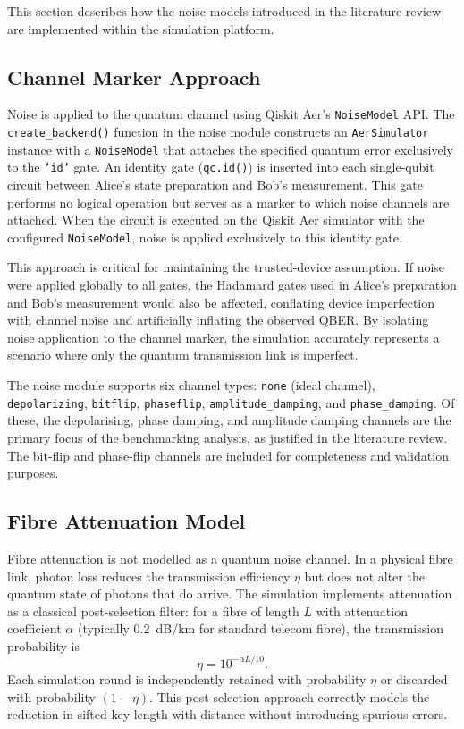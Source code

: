 \documentclass[10pt, a4paper]{report}
\begin{document}
This section describes how the noise models introduced in the literature review are implemented within the simulation platform.

\subsection{Channel Marker Approach}

Noise is applied to the quantum channel using Qiskit Aer's \texttt{NoiseModel} API. The \texttt{create\_backend()} function in the noise module constructs an \texttt{AerSimulator} instance with a \texttt{NoiseModel} that attaches the specified quantum error exclusively to the \texttt{'id'} gate. An identity gate (\texttt{qc.id()}) is inserted into each single-qubit circuit between Alice's state preparation and Bob's measurement. This gate performs no logical operation but serves as a marker to which noise channels are attached. When the circuit is executed on the Qiskit Aer simulator with the configured \texttt{NoiseModel}, noise is applied exclusively to this identity gate.

This approach is critical for maintaining the trusted-device assumption. If noise were applied globally to all gates, the Hadamard gates used in Alice's preparation and Bob's measurement would also be affected, conflating device imperfection with channel noise and artificially inflating the observed QBER. By isolating noise application to the channel marker, the simulation accurately represents a scenario where only the quantum transmission link is imperfect.

The noise module supports six channel types: \texttt{none} (ideal channel), \texttt{depolarizing}, \texttt{bitflip}, \texttt{phaseflip}, \texttt{amplitude\_damping}, and \texttt{phase\_damping}. Of these, the depolarising, phase damping, and amplitude damping channels are the primary focus of the benchmarking analysis, as justified in the literature review. The bit-flip and phase-flip channels are included for completeness and validation purposes.

\subsection{Fibre Attenuation Model}

Fibre attenuation is not modelled as a quantum noise channel. In a physical fibre link, photon loss reduces the transmission efficiency $\eta$ but does not alter the quantum state of photons that do arrive. The simulation implements attenuation as a classical post-selection filter: for a fibre of length $L$ with attenuation coefficient $\alpha$ (typically 0.2~dB/km for standard telecom fibre), the transmission probability is
%
\begin{equation}
\label{eq:attenuation}
\eta = 10^{-\alpha L / 10}.
\end{equation}
%
Each simulation round is independently retained with probability $\eta$ or discarded with probability $(1 - \eta)$. This post-selection approach correctly models the reduction in sifted key length with distance without introducing spurious errors.
\end{document}
